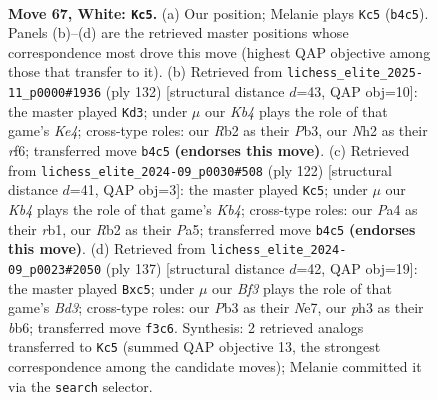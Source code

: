 \documentclass[11pt]{article}
\begin{document}
\clearpage

\begin{figure}[p]\centering
\begin{subfigure}{0.46\textwidth}\centering
\resizebox{\linewidth}{!}{%
\newchessgame
\chessboard[
  setfen={8/3k4/1B2b3/8/PK6/1P3Brp/1R5N/8 w - - 12 67},
  showmover=false,
  pgfstyle=straightmove, color=movearrow, markmove={b4-c5}
]}
\caption{}
\end{subfigure}\hfill
\begin{subfigure}{0.46\textwidth}\centering
\resizebox{\linewidth}{!}{%
\newchessgame
\chessboard[
  setfen={8/6k1/5r1b/p7/2B1K3/1P2P2R/8/8 w - - 6 67},
  showmover=false,
  pgfstyle=straightmove, color=movearrow, markmove={e4-d3}
]}
\caption{}
\end{subfigure}
\\[4pt]
\begin{subfigure}{0.46\textwidth}\centering
\resizebox{\linewidth}{!}{%
\newchessgame
\chessboard[
  setfen={8/7p/7P/P3R1B1/1K2b3/2P2k2/8/1r6 w - - 9 62},
  showmover=false,
  pgfstyle=straightmove, color=movearrow, markmove={b4-c5}
]}
\caption{}
\end{subfigure}\hfill
\begin{subfigure}{0.46\textwidth}\centering
\resizebox{\linewidth}{!}{%
\newchessgame
\chessboard[
  setfen={8/4n3/1B1b1kp1/1KP5/8/7p/1P1r4/1R6 b - - 0 69},
  showmover=false,
  pgfstyle=straightmove, color=movearrow, markmove={d6-c5}
]}
\caption{}
\end{subfigure}
\caption{\textbf{Move 67, White: \texttt{Kc5}.} (a) Our position; Melanie plays \texttt{Kc5} (\texttt{b4c5}). Panels (b)--(d) are the retrieved master positions whose correspondence most drove this move (highest QAP objective among those that transfer to it). (b) Retrieved from \texttt{lichess\_elite\_2025-11\_p0000\#1936} (ply 132) [structural distance $d$=43, QAP obj=10]: the master played \texttt{Kd3}; under $\mu$ our \emph{Kb4} plays the role of that game's \emph{Ke4}; cross-type roles: our \emph{R}b2 as their \emph{P}b3, our \emph{N}h2 as their \emph{r}f6; transferred move \texttt{b4c5} \textbf{(endorses this move)}. (c) Retrieved from \texttt{lichess\_elite\_2024-09\_p0030\#508} (ply 122) [structural distance $d$=41, QAP obj=3]: the master played \texttt{Kc5}; under $\mu$ our \emph{Kb4} plays the role of that game's \emph{Kb4}; cross-type roles: our \emph{P}a4 as their \emph{r}b1, our \emph{R}b2 as their \emph{P}a5; transferred move \texttt{b4c5} \textbf{(endorses this move)}. (d) Retrieved from \texttt{lichess\_elite\_2024-09\_p0023\#2050} (ply 137) [structural distance $d$=42, QAP obj=19]: the master played \texttt{Bxc5}; under $\mu$ our \emph{Bf3} plays the role of that game's \emph{Bd3}; cross-type roles: our \emph{P}b3 as their \emph{N}e7, our \emph{p}h3 as their \emph{b}b6; transferred move \texttt{f3c6}. Synthesis: 2 retrieved analogs transferred to \texttt{Kc5} (summed QAP objective 13, the strongest correspondence among the candidate moves); Melanie committed it via the \texttt{search} selector.}
\label{fig:thought-m132}
\end{figure}
\end{document}
